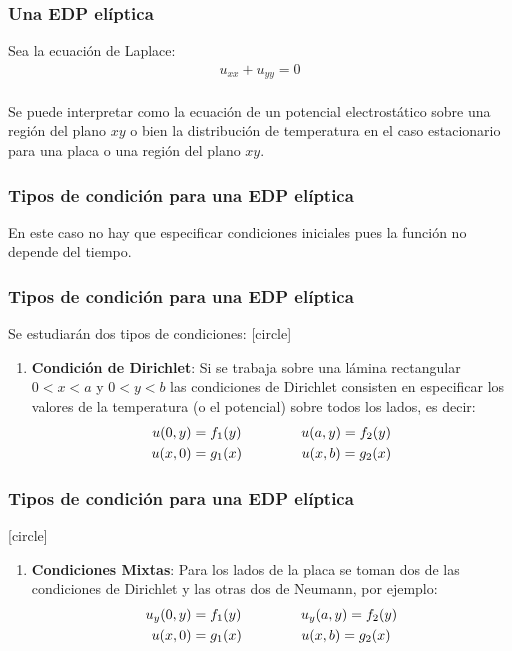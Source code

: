 \documentclass[12pt]{beamer}
\begin{document}
\begin{frame}
\frametitle{Una EDP elíptica}
Sea la ecuación de Laplace:
\begin{align*}
u_{xx} + u_{yy} = 0
\end{align*}
\\
\bigskip
\pause
Se puede interpretar como la ecuación de un potencial electrostático sobre una región del plano $xy$ o bien la distribución de temperatura en el caso estacionario para una placa o una región del plano $xy$.
\end{frame}
\begin{frame}
\frametitle{Tipos de condición para una EDP elíptica}
En este caso no hay que especificar condiciones iniciales pues la función no depende del tiempo.
\end{frame}
\begin{frame}
\frametitle{Tipos de condición para una EDP elíptica}
Se estudiarán dos tipos de condiciones:
[circle]
\begin{enumerate}[<+->]
\item \textbf{Condición de Dirichlet}: Si se trabaja sobre una lámina rectangular $0 < x < a$ y $0 < y < b$ las condiciones de Dirichlet consisten en especificar los valores de la temperatura (o el potencial) sobre todos los lados, es decir:
\begin{align}
\begin{aligned}
u(0, y) &= f_{1}(y) \hspace{1.5cm} u(a, y) = f_{2}(y) \\
u(x, 0) &= g_{1}(x) \hspace{1.5cm} u(x, b) = g_{2}(x)
\end{aligned}
\label{eq:ecuacion_06_02_05}
\end{align}
\seti
\end{enumerate}
\end{frame}
\begin{frame}
\frametitle{Tipos de condición para una EDP elíptica}
[circle]
\begin{enumerate}[<+->]
\conti
\item \textbf{Condiciones Mixtas}: Para los lados de la placa se toman dos de las condiciones de Dirichlet y las otras dos de Neumann, por ejemplo:
\begin{align}
\begin{aligned}
u_{y}(0, y) &= f_{1}(y) \hspace{1.5cm} u_{y}(a, y) = f_{2}(y) \\
u(x, 0) &= g_{1}(x) \hspace{1.5cm} u(x, b) = g_{2}(x)
\end{aligned}
\label{eq:ecuacion_06_01_06}
\end{align}
\end{enumerate}
\end{frame}
\end{document}
